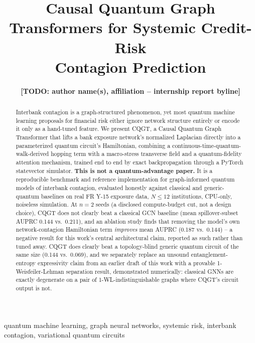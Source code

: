 \documentclass[journal]{IEEEtran}
\newcommand{\TODO}[1]{\textbf{\color{red}[TODO: #1]}}
\begin{document}
\title{Causal Quantum Graph Transformers for Systemic Credit-Risk\\Contagion Prediction}

\author{\TODO{author name(s), affiliation -- internship report byline}}

\markboth{}{}

\maketitle

\begin{abstract}
Interbank contagion is a graph-structured phenomenon, yet most quantum
machine learning proposals for financial risk either ignore network
structure entirely or encode it only as a hand-tuned feature. We present
CQGT, a Causal Quantum Graph Transformer that lifts a bank exposure
network's normalized Laplacian directly into a parameterized quantum
circuit's Hamiltonian, combining a continuous-time-quantum-walk-derived
hopping term with a macro-stress transverse field and a quantum-fidelity
attention mechanism, trained end to end by exact backpropagation through a
PyTorch statevector simulator. \textbf{This is not a quantum-advantage
paper.} It is a reproducible benchmark and reference implementation for
graph-informed quantum models of interbank contagion, evaluated honestly
against classical and generic-quantum baselines on real FR Y-15 exposure
data, $N \le 12$ institutions, CPU-only, noiseless simulation. At $n=2$
seeds (a disclosed compute-budget cut, not a design choice), CQGT does not
clearly beat a classical GCN baseline (mean spillover-subset AUPRC 0.144
vs.\ 0.211), and an ablation study finds that removing the model's own
network-contagion Hamiltonian term \emph{improves} mean AUPRC (0.187 vs.\
0.144) -- a negative result for this work's central architectural claim,
reported as such rather than tuned away. CQGT does clearly beat a
topology-blind generic quantum circuit of the same size (0.144 vs.\
0.069), and we separately replace an unsound entanglement-entropy
expressivity claim from an earlier draft of this work with a provable
1-Weisfeiler-Lehman separation result, demonstrated numerically: classical
GNNs are exactly degenerate on a pair of 1-WL-indistinguishable graphs
where CQGT's circuit output is not.
\end{abstract}

\begin{IEEEkeywords}
quantum machine learning, graph neural networks, systemic risk, interbank
contagion, variational quantum circuits
\end{IEEEkeywords}
\end{document}
